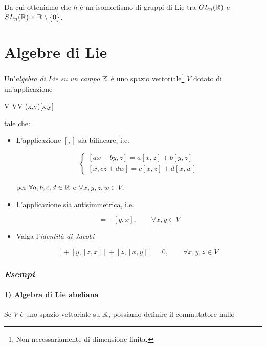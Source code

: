 Da cui otteniamo che $ h $ è un isomorfismo di gruppi di Lie tra $ GL_{n}(\mathbb{R}) $ e $ SL_{n}(\mathbb{R}) \times \mathbb{R} \setminus \{0\} $.

\section{Algebre di Lie}

Un'\textit{algebra di Lie su un campo} $ \mathbb{K} $ è uno spazio vettoriale\footnote{%
	Non necessariamente di dimensione finita.%
} $ V $ dotato di un'applicazione

\map{[,]}%
	{V \times V}{V}%
	{(x,y)}{[x,y]}

tale che:

\begin{itemize}
	\item L'applicazione $ [,] $ sia bilineare, i.e.
	
	\begin{equation}
		\begin{cases}
			[ax+by,z] = a[x,z] + b[y,z]\\
			[x,cz+dw] = c[x,z] + d[x,w]
		\end{cases}
	\end{equation}
	
	per $ \forall a,b,c,d \in \mathbb{R} $ e $ \forall x,y,z,w \in V $;
	
	\item L'applicazione sia antisimmetrica, i.e.
	
	\begin{equation}
		[x,y] = -[y,x], \qquad \forall x,y \in V
	\end{equation}
	
	\item Valga l'\textit{identità di Jacobi}
	
	\begin{equation}
		[x,[y,z]] + [y,[z,x]] + [z,[x,y]] = 0, \qquad \forall x,y,z \in V
	\end{equation}
\end{itemize}

\subsubsection{\textit{Esempi}}

\paragraph{1) Algebra di Lie abeliana}

Se $ V $ è uno spazio vettoriale su $ \mathbb{K} $, possiamo definire il commutatore nullo

